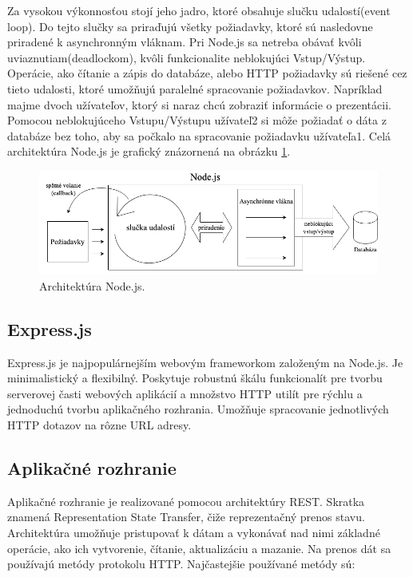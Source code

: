 Za vysokou výkonnosťou stojí jeho jadro, ktoré obsahuje slučku udalostí(event loop). Do tejto slučky sa priraďujú všetky požiadavky, ktoré sú nasledovne priradené k asynchronným vláknam. Pri Node.js sa netreba obávať kvôli uviaznutiam(deadlockom), kvôli funkcionalite neblokujúci Vstup/Výstup. Operácie, ako čítanie a zápis do databáze, alebo HTTP požiadavky sú riešené cez tieto udalosti, ktoré umožňujú paralelné spracovanie požiadavkov. Napríklad majme dvoch užívateľov, ktorý si naraz chcú zobraziť informácie o prezentácii. Pomocou neblokujúceho Vstupu/Výstupu užívateľ2 si môže požiadať o dáta z databáze bez toho, aby sa počkalo na spracovanie požiadavku užívateľa1. Celá architektúra Node.js je grafický znázornená na obrázku \ref{pic:nodejs}.

    \begin{figure}[!hbt]
        \centering
        \includegraphics[scale=0.5]{obrazky/nodejs.png}
        \caption{Architektúra Node.js.}
        \label{pic:nodejs}
    \end{figure}
    
\subsection*{Express.js}
\label{express}
Express.js\cite{expressjs} je najpopulárnejším webovým frameworkom založeným na Node.js. Je minimalistický a flexibilný. Poskytuje robustnú škálu funkcionalít pre tvorbu serverovej časti webových aplikácií a množstvo HTTP utilít pre rýchlu a jednoduchú tvorbu aplikačného rozhrania. Umožňuje spracovanie jednotlivých HTTP dotazov na rôzne URL adresy.

\subsection{Aplikačné rozhranie}
\label{api}
Aplikačné rozhranie je realizované pomocou architektúry REST. Skratka znamená Representation State Transfer, čiže reprezentačný prenos stavu. Architektúra umožňuje pristupovať k dátam a vykonávať nad nimi základné operácie, ako ich vytvorenie, čítanie, aktualizáciu a mazanie. Na prenos dát sa používajú metódy protokolu HTTP. Najčastejšie používané metódy sú:

